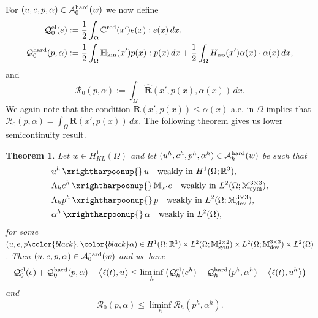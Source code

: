 \documentclass[reqno,10pt]{amsart}
\numberwithin{equation}{section}
\newtheorem{theorem}{Theorem}[section]
\theoremstyle{remark}
\newcommand{\RED}{\color{black}}
\newcommand{\BLACK}{\color{black}}
\newcommand{\calA}{\mathcal{A}}
\newcommand{\C}{\mathbb{C}}
\newcommand{\M}{\mathbb{M}}
\newcommand{\calQ}{\mathcal{Q}}
\newcommand{\R}{\mathbb{R}}
\newcommand{\calR}{\mathcal{R}}
\DeclareMathOperator{\dev}{dev}
\DeclareMathOperator{\sym}{sym}
\newcommand{\weak}{\,\xrightharpoonup{}\,}
\newcommand{\Hkin}{\mathbb{H}_{\rm kin}}
\newcommand{\Hiso}{H_{\rm iso}}
\newcommand{\disspot}{\mathbf{R}}
\newcommand{\gendisspot}{\widehat{\disspot}}
\newcommand{\red}[1]{#1^{\rm red}}
\begin{document}
For $(u, e, p, \alpha) \in \calA_{0}^{\rm hard}(w)$ we now define
\begin{align}
	\calQ^{\rm el}_{0}(e) & := \frac{1}{2} \int_{\Omega} \red{\C}(x') e(x) : e(x) \,dx, \label{definition Q^el_0}\\
	\calQ^{\rm hard}_{0}(p, \alpha) & := \frac{1}{2} \int_{\Omega} \Hkin(x') p(x) : p(x) \,dx + \frac{1}{2} \int_{\Omega} \Hiso(x') \alpha(x) \cdot \alpha(x) \,dx, \label{definition Q^hard_0}
\end{align}
and
\begin{equation} \label{definition R_0}
	\calR_{0}(p, \alpha) := \int_{\Omega} \gendisspot(x', p(x), \alpha(x)) \,dx.
\end{equation}
We again note that the condition $\disspot(x', p(x)) \leq \alpha(x)$ a.e. in $\Omega$ implies that $\calR_{0}(p, \alpha) = \int_{\Omega} \disspot(x', p(x)) \,dx$.
The following theorem gives us lower semicontinuity result. 
\begin{theorem} \label{lower semicontinuity of energies - h to 0}
Let $w \in H^1_{KL}(\Omega)$ and let $(u^h, e^h, p^h, \alpha^h) \in \calA_{h}^{\rm hard}( w)$ be such that
\begin{align}
	\label{lower semicontinuity convergence to u} & u^h \weak u \quad \text{weakly in $H^1(\Omega;\R^3)$},\\
	\label{lower semicontinuity convergence to e} & \Lambda_h e^h \weak \M_{x'} e \quad \text{weakly in $L^2(\Omega;\M^{3 \times 3}_{\sym})$},\\
	\label{lower semicontinuity convergence to p}& \Lambda_h p^h \weak p \quad \text{weakly in $L^2(\Omega;\M^{3 \times 3}_{\dev})$},\\
	\label{lower semicontinuity convergence to alpha}& \alpha^h \weak \alpha \quad \text{weakly in $L^2(\Omega)$},
\end{align}
for some $(u, e, p{\RED,\BLACK} \alpha)\in H^1(\Omega;\R^3) \times L^2(\Omega;\M^{2 \times 2}_{\sym}) \times L^2(\Omega;\M^{3 \times 3}_{\dev}) \times L^2(\Omega) $. 
Then $(u, e, p, \alpha) \in \calA_{0}^{\rm hard}(w)$ and we have
\begin{equation} \label{lower semicontinuity Eh}
	\calQ^{\rm el}_{0}(e) + \calQ^{\rm hard}_{0}(p, \alpha) - \big\langle \ell(t), u \big\rangle 
	\leq \liminf\limits_{h} \left( \calQ^{\rm el}_{h}(e^h) + \calQ^{\rm hard}_{h}(p^h, \alpha^h) - \big\langle \ell(t), u^h \big\rangle \right)
\end{equation}
and
\begin{equation} \label{lower semicontinuity Rh}
	\calR_{0}(p, \alpha) \leq \liminf\limits_{h} \calR_{h}(p^h, \alpha^h).
\end{equation}
\end{theorem}
\end{document}

